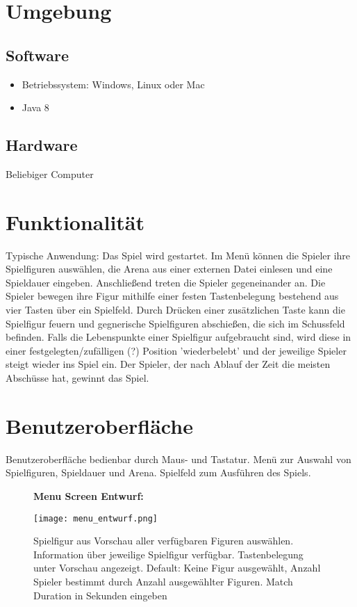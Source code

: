 \section{Umgebung}
\subsection{Software}
\begin{itemize}
\item Betriebssystem: Windows, Linux oder Mac
\item Java 8
\end{itemize}
\subsection{Hardware}
Beliebiger Computer

\section{Funktionalität}
Typische Anwendung: Das Spiel wird gestartet. Im Menü können die Spieler ihre Spielfiguren auswählen, die Arena aus einer externen Datei einlesen und eine Spieldauer eingeben. Anschließend treten die Spieler gegeneinander an. Die Spieler bewegen ihre Figur mithilfe einer festen Tastenbelegung bestehend aus vier Tasten über ein Spielfeld. Durch Drücken einer zusätzlichen Taste kann die Spielfigur feuern und gegnerische Spielfiguren abschießen, die sich im Schussfeld befinden. Falls die Lebenspunkte einer Spielfigur aufgebraucht sind, wird diese in einer festgelegten/zufälligen (?) Position 'wiederbelebt' und der jeweilige Spieler steigt wieder ins Spiel ein. Der Spieler, der nach Ablauf der Zeit die meisten Abschüsse hat, gewinnt das Spiel.

\section{Benutzeroberfläche}
Benutzeroberfläche bedienbar durch Maus- und Tastatur.
Menü zur Auswahl von Spielfiguren, Spieldauer und Arena. Spielfeld zum Ausführen des Spiels.
\begin{figure}[H]
\textbf{Menu Screen Entwurf:}\par\medskip
\centering
\texttt{[image: menu\_entwurf.png]}
 \caption{Spielfigur aus Vorschau aller verfügbaren Figuren auswählen. Information über jeweilige Spielfigur verfügbar. Tastenbelegung unter Vorschau angezeigt. Default: Keine Figur ausgewählt, Anzahl Spieler bestimmt durch Anzahl ausgewählter Figuren. Match Duration in Sekunden eingeben}
\end{figure}

